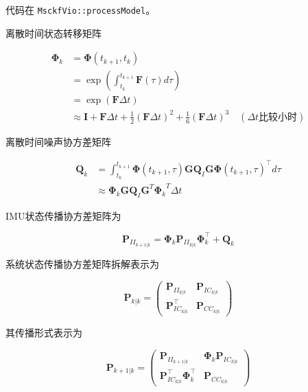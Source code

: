 \documentclass[12pt,a4paper]{article}
\begin{document}
代码在 \verb|MsckfVio::processModel|。

离散时间状态转移矩阵

\begin{equation}
\begin{aligned}
\boldsymbol{\Phi}_k 
&= \boldsymbol{\Phi}(t_{k+1}, t_k) \\
&= \exp\left(\int_{t_k}^{t_{k+1}} \mathbf{F}(\tau)d\tau\right) \\
&= \exp(\mathbf{F} \Delta t) \\
&\approx 
\mathbf{I} + \mathbf{F} \Delta t + 
\frac{1}{2} (\mathbf{F} \Delta t)^2 + \frac{1}{6} (\mathbf{F} \Delta t)^3
\quad (\Delta t \text{比较小时})
\end{aligned}
\end{equation}

离散时间噪声协方差矩阵

\begin{equation}
\begin{aligned}
\mathbf{Q}_k 
&=
\int_{t_k}^{t_{k+1}} \boldsymbol{\Phi}(t_{k+1},\tau)\mathbf{G}\mathbf{Q}_I\mathbf{G}\boldsymbol{\Phi}(t_{k+1},\tau)^\top d\tau \\
&\approx 
\boldsymbol{\Phi}_k \mathbf{G} \mathbf{Q}_I \mathbf{G}^T {\boldsymbol{\Phi}_k}^T \Delta t
\end{aligned}
\end{equation}

IMU状态传播协方差矩阵为

\begin{equation*}
\mathbf{P}_{II_{k+1|k}} = 
\boldsymbol{\Phi}_k\mathbf{P}_{II_{k|k}}\boldsymbol{\Phi}_k^\top + \mathbf{Q}_k
\end{equation*}

系统状态传播协方差矩阵拆解表示为

\begin{equation*}
\mathbf{P}_{k|k} = 
\begin{pmatrix}
\mathbf{P}_{II_{k|k}} & \mathbf{P}_{IC_{k|k}} \\
\mathbf{P}_{IC_{k|k}}^\top & \mathbf{P}_{CC_{k|k}}
\end{pmatrix}
\end{equation*}

其传播形式表示为

\begin{equation*}
\mathbf{P}_{k+1|k} = 
\begin{pmatrix}
\mathbf{P}_{II_{k+1|k}} & \boldsymbol{\Phi}_k \mathbf{P}_{IC_{k|k}} \\
\mathbf{P}_{IC_{k|k}}^\top \boldsymbol{\Phi}_k^\top & \mathbf{P}_{CC_{k|k}}
\end{pmatrix}
\end{equation*}
\end{document}
